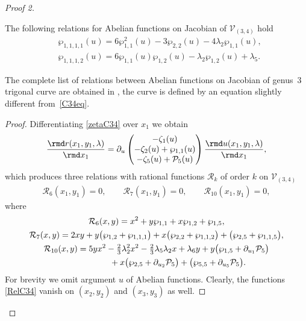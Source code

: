 \begin{proof}[Proof 2]
\begin{Lemma}\label{L:ind4WPC34}
The following relations for Abelian functions on Jacobian of $\mathcal{V}_{(3,4)}$ hold
\begin{subequations}\label{C34WP4rel}
\begin{align}
 &\wp_{1,1,1,1}(u) = 6 \wp_{1,1}^2(u)-3\wp_{2,2}(u) - 4 \lambda_2 \wp_{1,1}(u),\label{wp1111RelC34} \\
 &\wp_{1,1,1,2}(u) = 6\wp_{1,1}(u)\wp_{1,2}(u) - \lambda_2 \wp_{1,2}(u) + \lambda_5. \label{wp1112RelC34}
\end{align}
\end{subequations}
\end{Lemma}
\begin{Remark} The complete list of relations between Abelian functions on Jacobian of genus~$3$ trigonal curve are obtained in \cite{Eilb2011}, the curve is defined by an equation slightly different from~\eqref{C34eq}.
\end{Remark}
\begin{proof}Differentiating \eqref{zetaC34} over $x_1$ we obtain
\begin{gather*}
 \frac{\rmd r(x_1,y_1,\lambda)}{\rmd x_1} = \partial_{u} \begin{pmatrix}
 -\zeta_1(u) \\
 -\zeta_2(u) + \wp_{1,1}(u)\\
 -\zeta_5(u) + \mathcal{P}_5(u) \end{pmatrix} \frac{\rmd u(x_1,y_1,\lambda)}{\rmd x_1},
\end{gather*}
which produces three relations with rational functions $\mathcal{R}_k$ of order $k$ on $\mathcal{V}_{(3,4)}$
\begin{gather*}
 \mathcal{R}_6(x_1,y_1) = 0, \qquad \mathcal{R}_7(x_1,y_1) = 0, \qquad \mathcal{R}_{10}(x_1,y_1) = 0,
\end{gather*}
where
\begin{subequations}\label{RelC34}
 \begin{gather}
 \mathcal{R}_6(x,y) = x^2 + y \wp_{1,1} + x \wp_{1,2} + \wp_{1,5},\label{R6RelC34}\\
 \mathcal{R}_7(x,y) = 2 x y + y \big(\wp_{1,2} + \wp_{1,1,1}\big) + x \big(\wp_{2,2} + \wp_{1,1,2}\big)
 + \big(\wp_{2,5} + \wp_{1,1,5}\big), \label{R7RelC34}\\
 \mathcal{R}_{10}(x,y) = 5 y x^2 - \tfrac{2}{3} \lambda_2^2 x^2 - \tfrac{2}{3} \lambda_5 \lambda_2 x + \lambda_6 y + y \big(\wp_{1,5} + \partial_{u_1} \mathcal{P}_5\big) \notag\\
\hphantom{\mathcal{R}_{10}(x,y) =}{} + x \big(\wp_{2,5} + \partial_{u_2} \mathcal{P}_5\big) + \big(\wp_{5,5} + \partial_{u_5} \mathcal{P}_5\big).\label{R10RelC34}
 \end{gather}
\end{subequations}
For brevity we omit argument $u$ of Abelian functions. Clearly, the functions \eqref{RelC34} vanish on $(x_2,y_2)$ and $(x_3,y_3)$ as well.


\end{proof}
\end{proof}
